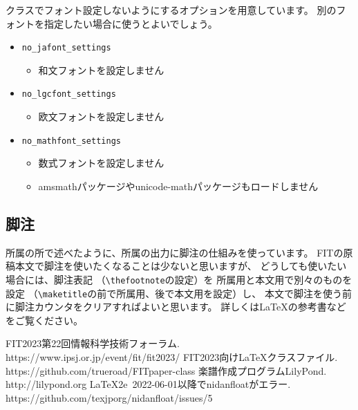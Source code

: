\documentclass{FITpaper}
\begin{document}
クラスでフォント設定しないようにするオプションを用意しています。
別のフォントを指定したい場合に使うとよいでしょう。

\begin{itemize}
\item \texttt{no\_jafont\_settings}
  \begin{itemize}
  \item 和文フォントを設定しません
  \end{itemize}
\item \texttt{no\_lgcfont\_settings}
  \begin{itemize}
  \item 欧文フォントを設定しません
  \end{itemize}
\item \texttt{no\_mathfont\_settings}
  \begin{itemize}
  \item 数式フォントを設定しません
  \item amsmathパッケージやunicode-mathパッケージもロードしません
  \end{itemize}
\end{itemize}

\subsection{脚注}

所属の所で述べたように、所属の出力に脚注の仕組みを使っています。
FITの原稿本文で脚注を使いたくなることは少ないと思いますが、
どうしても使いたい場合には、脚注表記
（\texttt{\textbackslash thefootnote}の設定）を
所属用と本文用で別々のものを設定
（\texttt{\textbackslash maketitle}の前で所属用、後で本文用を設定）し、
本文で脚注を使う前に脚注カウンタをクリアすればよいと思います。
詳しくは\LaTeX の参考書などをご覧ください。


\begin{thebibliography}{9}

  FIT2023第22回情報科学技術フォーラム. \\
  https://www.ipsj.or.jp/event/fit/fit2023/
  FIT2023向け\LaTeX クラスファイル. \\
  https://github.com/trueroad/FITpaper-class
  楽譜作成プログラムLilyPond. \\
  http://lilypond.org
  \LaTeX2e~2022-06-01以降でnidanfloatがエラー. \\
  https://github.com/texjporg/nidanfloat/issues/5

\end{thebibliography}
\end{document}
